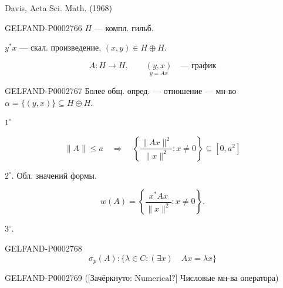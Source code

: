 Davis, Acta Sci. Math. (1968)

\begin{GelfandAdjacentEvidence}{GELFAND-P000276}{6}
$H$ --- компл. гильб.

\end{GelfandAdjacentEvidence}


$y^*x$ --- скал. произведение, $(x,y)\in H\oplus H$.

\begin{equation*}A:H\to H,\qquad\underset{y=Ax}{(y,x)}\quad\text{--- график}\end{equation*}

\begin{GelfandAdjacentEvidence}{GELFAND-P000276}{7}
Более общ. опред. --- отношение --- мн-во $\alpha=\{(y,x)\}\subseteq H\oplus H$.

\end{GelfandAdjacentEvidence}


$1^{\circ}$

\begin{equation*}\|A\|\le a\quad\Rightarrow\quad\left\{\frac{\|Ax\|^2}{\|x\|^2}:x\ne0\right\}\subseteq[0,a^2]\end{equation*}

\par\noindent\begin{minipage}{\linewidth}
$2^{\circ}$. Обл. значений формы.

\begin{equation*}w(A)=\left\{\frac{x^*Ax}{\|x\|^2}:x\ne0\right\}.\end{equation*}
\end{minipage}

$3^{\circ}$.

\begin{GelfandAdjacentEvidence}{GELFAND-P000276}{8}
\begin{equation*}\sigma_p(A):\{\lambda\in C:(\exists x)\quad Ax=\lambda x\}\end{equation*}

\end{GelfandAdjacentEvidence}


\begin{GelfandAdjacentEvidence}{GELFAND-P000276}{9}
([Зачёркнуто: Numerical?] Числовые мн-ва оператора)

\end{GelfandAdjacentEvidence}


